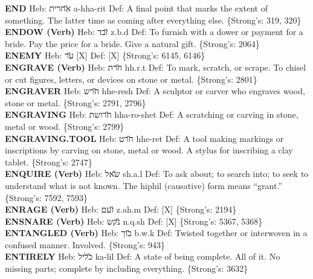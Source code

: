 {\textbf{END} Heb: {\large\H אחרית} a-hha-rit Def: A final point that marks the extent of something. The latter time as coming after everything else. \{Strong's: 319, 320\}\hfill{}\\

\textbf{ENDOW (Verb)} Heb: {\large\H זבד} z.b.d Def: To furnish with a dower or payment for a bride. Pay the price for a bride. Give a natural gift. \{Strong's: 2064\}\hfill{}\\

\textbf{ENEMY} Heb: {\large\H ער} {[}X{]} Def: {[}X{]} \{Strong's: 6145, 6146\}\hfill{}\\

\textbf{ENGRAVE (Verb)} Heb: {\large\H חרת} hh.r.t Def: To mark, scratch, or scrape. To chisel or cut figures, letters, or devices on stone or metal. \{Strong's: 2801\}\hfill{}\\

\textbf{ENGRAVER} Heb: {\large\H חרש} hhe-resh Def: A sculptor or carver who engraves wood, stone or metal. \{Strong's: 2791, 2796\}\hfill{}\\

\textbf{ENGRAVING} Heb: {\large\H חרושת} hha-ro-shet Def: A scratching or carving in stone, metal or wood. \{Strong's: 2799\}\hfill{}\\

\textbf{ENGRAVING.TOOL} Heb: {\large\H חרט} hhe-ret Def: A tool making markings or inscriptions by carving on stone, metal or wood. A stylus for inscribing a clay tablet. \{Strong's: 2747\}\hfill{}\\

\textbf{ENQUIRE (Verb)} Heb: {\large\H שאל} sh.a.l Def: To ask about; to search into; to seek to understand what is not known. The hiphil (causative) form means ``grant.'' \{Strong's: 7592, 7593\}\hfill{}\\

\textbf{ENRAGE (Verb)} Heb: {\large\H זעם} z.ah.m Def: {[}X{]} \{Strong's: 2194\}\hfill{}\\

\textbf{ENSNARE (Verb)} Heb: {\large\H נקש} n.q.sh Def: {[}X{]} \{Strong's: 5367, 5368\}\hfill{}\\

\textbf{ENTANGLED (Verb)} Heb: {\large\H בוך} b.w.k Def: Twisted together or interwoven in a confused manner. Involved. \{Strong's: 943\}\hfill{}\\

\textbf{ENTIRELY} Heb: {\large\H כליל} ka-lil Def: A state of being complete. All of it. No missing parts; complete by including everything. \{Strong's: 3632\}\hfill{}\\

}
